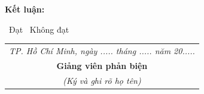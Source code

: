 \vspace{0.6cm}

\noindent
\textbf{Kết luận:}

\vspace{0.25cm}
\fbox{\rule{0pt}{1.3ex}\rule{1.3ex}{0pt}}~Đạt
\hspace{1.6cm}
\fbox{\rule{0pt}{1.3ex}\rule{1.3ex}{0pt}}~Không đạt

\vspace{3cm}

\begin{flushright}
		\begin{tabular}{c}
			\textit{TP. Hồ Chí Minh, ngày ..... tháng ..... năm 20.....}\\[0.2cm]
            \textbf{Giảng viên phản biện}\\
            \textit{(Ký và ghi rõ họ tên)}
		\end{tabular}
\end{flushright}
